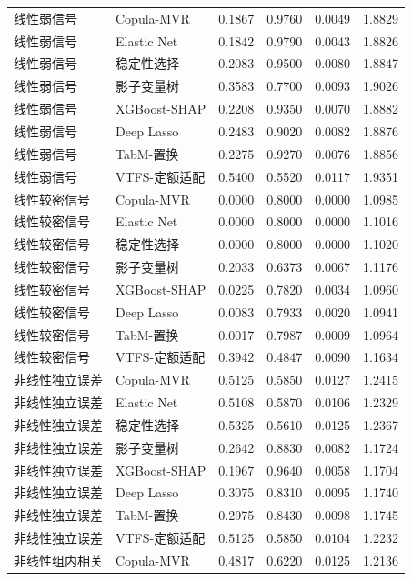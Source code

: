 \documentclass{sufethesismas}
\begin{document}
{\begin{longtable}[]{@{}llllll@{}}
线性弱信号 & Copula-MVR & 0.1867 & 0.9760 & 0.0049 & 1.8829 \\
线性弱信号 & Elastic Net & 0.1842 & 0.9790 & 0.0043 & 1.8826 \\
线性弱信号 & 稳定性选择 & 0.2083 & 0.9500 & 0.0080 & 1.8847 \\
线性弱信号 & 影子变量树 & 0.3583 & 0.7700 & 0.0093 & 1.9026 \\
线性弱信号 & XGBoost-SHAP & 0.2208 & 0.9350 & 0.0070 & 1.8882 \\
线性弱信号 & Deep Lasso & 0.2483 & 0.9020 & 0.0082 & 1.8876 \\
线性弱信号 & TabM-置换 & 0.2275 & 0.9270 & 0.0076 & 1.8856 \\
线性弱信号 & VTFS-定额适配 & 0.5400 & 0.5520 & 0.0117 & 1.9351 \\
线性较密信号 & Copula-MVR & 0.0000 & 0.8000 & 0.0000 & 1.0985 \\
线性较密信号 & Elastic Net & 0.0000 & 0.8000 & 0.0000 & 1.1016 \\
线性较密信号 & 稳定性选择 & 0.0000 & 0.8000 & 0.0000 & 1.1020 \\
线性较密信号 & 影子变量树 & 0.2033 & 0.6373 & 0.0067 & 1.1176 \\
线性较密信号 & XGBoost-SHAP & 0.0225 & 0.7820 & 0.0034 & 1.0960 \\
线性较密信号 & Deep Lasso & 0.0083 & 0.7933 & 0.0020 & 1.0941 \\
线性较密信号 & TabM-置换 & 0.0017 & 0.7987 & 0.0009 & 1.0964 \\
线性较密信号 & VTFS-定额适配 & 0.3942 & 0.4847 & 0.0090 & 1.1634 \\
非线性独立误差 & Copula-MVR & 0.5125 & 0.5850 & 0.0127 & 1.2415 \\
非线性独立误差 & Elastic Net & 0.5108 & 0.5870 & 0.0106 & 1.2329 \\
非线性独立误差 & 稳定性选择 & 0.5325 & 0.5610 & 0.0125 & 1.2367 \\
非线性独立误差 & 影子变量树 & 0.2642 & 0.8830 & 0.0082 & 1.1724 \\
非线性独立误差 & XGBoost-SHAP & 0.1967 & 0.9640 & 0.0058 & 1.1704 \\
非线性独立误差 & Deep Lasso & 0.3075 & 0.8310 & 0.0095 & 1.1740 \\
非线性独立误差 & TabM-置换 & 0.2975 & 0.8430 & 0.0098 & 1.1745 \\
非线性独立误差 & VTFS-定额适配 & 0.5125 & 0.5850 & 0.0104 & 1.2232 \\
非线性组内相关 & Copula-MVR & 0.4817 & 0.6220 & 0.0125 & 1.2136 \\

\end{longtable}}
\end{document}
